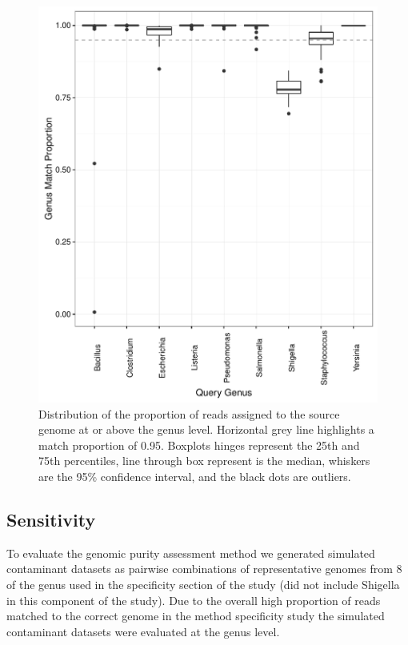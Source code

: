 \documentclass[fleqn,10pt,lineno]{wlpeerj}\usepackage[]{graphicx}\usepackage[]{color}
\makeatletter
\def\maxwidth{ %
  \ifdim\Gin@nat@width>\linewidth
    \linewidth
  \else
    \Gin@nat@width
  \fi
}
\newenvironment{knitrout}{}{} %
\makeatother
\begin{document}
 

\begin{knitrout}
\color{fgcolor}\begin{figure}

{\centering \includegraphics[width=\maxwidth]{figure/single_genus_plot-1} 

}

\caption[Distribution of the proportion of reads assigned to the source genome at or above the genus level]{Distribution of the proportion of reads assigned to the source genome at or above the genus level. Horizontal grey line highlights a match proportion of 0.95. Boxplots hinges represent the 25th and 75th percentiles, line through box represent is the median, whiskers are the 95\% confidence interval, and the black dots are outliers.}\label{fig:single_genus_plot}
\end{figure}


\end{knitrout}

\subsection*{Sensitivity}
To evaluate the genomic purity assessment method we generated simulated contaminant datasets as pairwise combinations of representative genomes from 8 of the genus used in the specificity section of the study (did not include Shigella in this component of the study). Due to the overall high proportion of reads matched to the correct genome in the method specificity study the simulated contaminant datasets were evaluated at the genus level.
\end{document}
